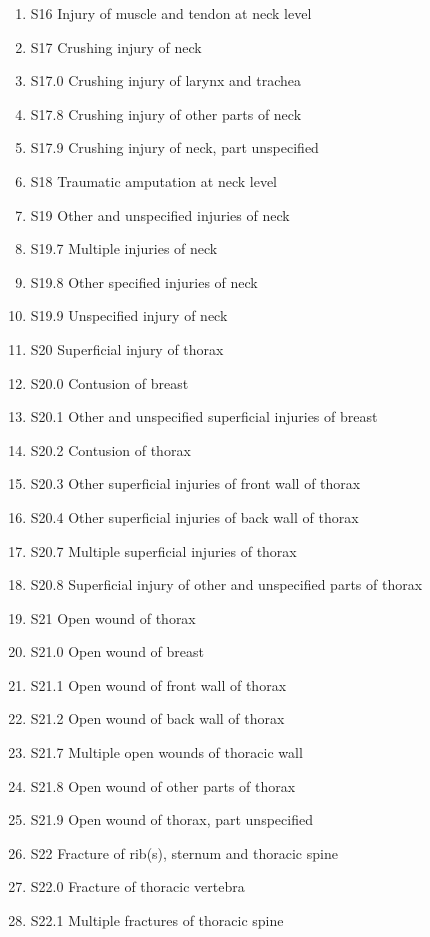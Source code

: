 \documentclass[
]{scrartcl}
\begin{document}
\begin{itemize}
\begin{enumerate}
  \item
    S16 Injury of muscle and tendon at neck level
  \item
    S17 Crushing injury of neck
  \item
    S17.0 Crushing injury of larynx and trachea
  \item
    S17.8 Crushing injury of other parts of neck
  \item
    S17.9 Crushing injury of neck, part unspecified
  \item
    S18 Traumatic amputation at neck level
  \item
    S19 Other and unspecified injuries of neck
  \item
    S19.7 Multiple injuries of neck
  \item
    S19.8 Other specified injuries of neck
  \item
    S19.9 Unspecified injury of neck
  \item
    S20 Superficial injury of thorax
  \item
    S20.0 Contusion of breast
  \item
    S20.1 Other and unspecified superficial injuries of breast
  \item
    S20.2 Contusion of thorax
  \item
    S20.3 Other superficial injuries of front wall of thorax
  \item
    S20.4 Other superficial injuries of back wall of thorax
  \item
    S20.7 Multiple superficial injuries of thorax
  \item
    S20.8 Superficial injury of other and unspecified parts of thorax
  \item
    S21 Open wound of thorax
  \item
    S21.0 Open wound of breast
  \item
    S21.1 Open wound of front wall of thorax
  \item
    S21.2 Open wound of back wall of thorax
  \item
    S21.7 Multiple open wounds of thoracic wall
  \item
    S21.8 Open wound of other parts of thorax
  \item
    S21.9 Open wound of thorax, part unspecified
  \item
    S22 Fracture of rib(s), sternum and thoracic spine
  \item
    S22.0 Fracture of thoracic vertebra
  \item
    S22.1 Multiple fractures of thoracic spine

\end{enumerate}
\end{itemize}
\end{document}
